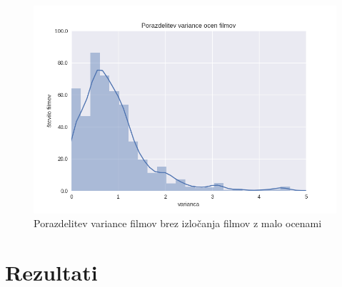 \documentclass[a4paper,11pt]{article}
\begin{document}
\begin{figure}[htbp]
\begin{center}
\includegraphics[scale=0.7]{porazdelitevPrva.png}
\caption{Porazdelitev variance filmov brez izločanja filmov z malo ocenami}
\label{slika1}
\end{center}
\end{figure}

\section{Rezultati}



\end{document}
